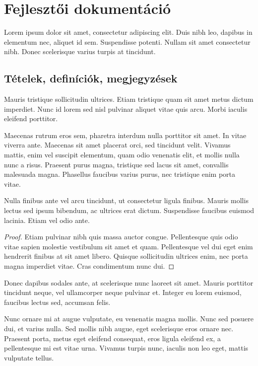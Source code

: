 \chapter{Fejlesztői dokumentáció} %
\label{ch:impl}

Lorem ipsum dolor sit amet, consectetur adipiscing elit. Duis nibh leo, dapibus in elementum nec, aliquet id sem. Suspendisse potenti. Nullam sit amet consectetur nibh. Donec scelerisque varius turpis at tincidunt.


\section{Tételek, definíciók, megjegyzések} %

\begin{definition}
Mauris tristique sollicitudin ultrices. Etiam tristique quam sit amet metus dictum imperdiet. Nunc id lorem sed nisl pulvinar aliquet vitae quis arcu. Morbi iaculis eleifend porttitor.
\end{definition}

Maecenas rutrum eros sem, pharetra interdum nulla porttitor sit amet. In vitae viverra ante. Maecenas sit amet placerat orci, sed tincidunt velit. Vivamus mattis, enim vel suscipit elementum, quam odio venenatis elit, et mollis nulla nunc a risus. Praesent purus magna, tristique sed lacus sit amet, convallis malesuada magna. Phasellus faucibus varius purus, nec tristique enim porta vitae.

\begin{theorem}
Nulla finibus ante vel arcu tincidunt, ut consectetur ligula finibus. Mauris mollis lectus sed ipsum bibendum, ac ultrices erat dictum. Suspendisse faucibus euismod lacinia. Etiam vel odio ante.
\end{theorem}
\begin{proof}
Etiam pulvinar nibh quis massa auctor congue. Pellentesque quis odio vitae sapien molestie vestibulum sit amet et quam. Pellentesque vel dui eget enim hendrerit finibus at sit amet libero. Quisque sollicitudin ultrices enim, nec porta magna imperdiet vitae. Cras condimentum nunc dui.
\end{proof}

Donec dapibus sodales ante, at scelerisque nunc laoreet sit amet. Mauris porttitor tincidunt neque, vel ullamcorper neque pulvinar et. Integer eu lorem euismod, faucibus lectus sed, accumsan felis. 

\begin{remark}
Nunc ornare mi at augue vulputate, eu venenatis magna mollis. Nunc sed posuere dui, et varius nulla. Sed mollis nibh augue, eget scelerisque eros ornare nec. Praesent porta, metus eget eleifend consequat, eros ligula eleifend ex, a pellentesque mi est vitae urna. Vivamus turpis nunc, iaculis non leo eget, mattis vulputate tellus.
\end{remark}

